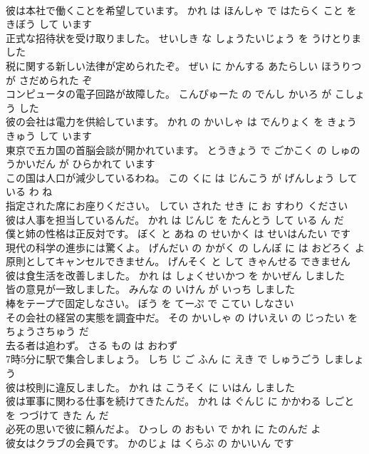 \documentclass[8pt]{extreport}
\begin{document}
\begin{CJK}{UTF8}{min}
\\	彼は本社で働くことを希望しています。	かれ は ほんしゃ で はたらく こと を きぼう して います 
\\	正式な招待状を受け取りました。	せいしき な しょうたいじょう を うけとりました 
\\	税に関する新しい法律が定められたぞ。	ぜい に かんする あたらしい ほうりつ が さだめられた ぞ 
\\	コンピュータの電子回路が故障した。	こんぴゅーた の でんし かいろ が こしょう した 
\\	彼の会社は電力を供給しています。	かれ の かいしゃ は でんりょく を きょうきゅう して います 
\\	東京で五カ国の首脳会談が開かれています。	とうきょう で ごかこく の しゅのうかいだん が ひらかれて います 
\\	この国は人口が減少しているわね。	この くに は じんこう が げんしょう して いる わ ね 
\\	指定された席にお座りください。	してい された せき に お すわり ください 
\\	彼は人事を担当しているんだ。	かれ は じんじ を たんとう して いる ん だ 
\\	僕と姉の性格は正反対です。	ぼく と あね の せいかく は せいはんたい です 
\\	現代の科学の進歩には驚くよ。	げんだい の かがく の しんぽ に は おどろく よ 
\\	原則としてキャンセルできません。	げんそく と して きゃんせる できません 
\\	彼は食生活を改善しました。	かれ は しょくせいかつ を かいぜん しました 
\\	皆の意見が一致しました。	みんな の いけん が いっち しました 
\\	棒をテープで固定しなさい。	ぼう を てーぷ で こてい しなさい 
\\	その会社の経営の実態を調査中だ。	その かいしゃ の けいえい の じったい を ちょうさちゅう だ 
\\	去る者は追わず。	さる もの は おわず 
\\	7時5分に駅で集合しましょう。	しち じ ご ふん に えき で しゅうごう しましょう 
\\	彼は校則に違反しました。	かれ は こうそく に いはん しました 
\\	彼は軍事に関わる仕事を続けてきたんだ。	かれ は ぐんじ に かかわる しごと を つづけて きた ん だ 
\\	必死の思いで彼に頼んだよ。	ひっし の おもい で かれ に たのんだ よ 
\\	彼女はクラブの会員です。	かのじょ は くらぶ の かいいん です 

\end{CJK}
\end{document}
